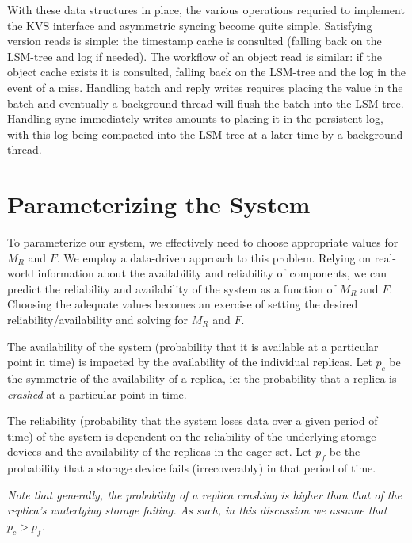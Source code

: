 With these data structures in place, the various operations
requried to implement the \ac{KVS} interface and asymmetric
syncing become quite simple. Satisfying version reads is simple:
the timestamp cache is consulted (falling back on the
\ac{LSM-tree} and log if needed). The workflow of an object read
is similar: if the object cache exists it is consulted, falling
back on the \ac{LSM-tree} and the log in the event of a miss.
Handling batch and reply writes requires placing the value
in the batch and eventually a background thread will flush the
batch into the \ac{LSM-tree}. Handling sync immediately writes
amounts to placing it in the persistent log, with this log being
compacted into the \ac{LSM-tree} at a later time by a background
thread.


\section{Parameterizing the System}\label{sec:r2s2parameterization}

To parameterize our system, we effectively need to choose
appropriate values for $M_R$ and $F$. We employ a data-driven
approach to this problem. Relying on real-world information about
the availability and reliability of components, we can predict
the reliability and availability of the system as a function of
$M_R$ and $F$. Choosing the adequate values becomes an exercise of
setting the desired reliability/availability and solving for $M_R$
and $F$.

The availability of the system (probability that it is available
at a particular point in time) is impacted by the availability of
the individual replicas. Let $p_c$ be the symmetric of the
availability of a replica, ie: the probability that a replica is
\emph{crashed} at a particular point in time.

The reliability (probability that the system loses data over a
given period of time) of the
system is dependent on the reliability of the underlying storage
devices and the availability of the replicas in the eager set.
Let $p_f$ be the probability that a storage device fails
(irrecoverably) in that period of time.

\emph{Note that generally, the probability of a replica crashing
is higher than that of the replica's underlying storage failing.
As such, in this discussion we assume that $p_c > p_f$.}

